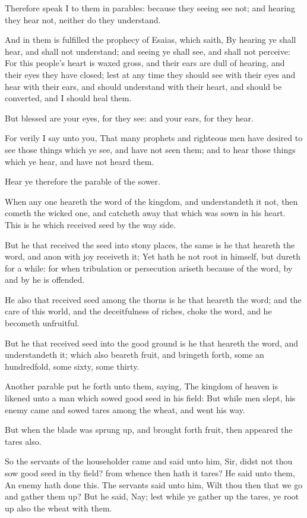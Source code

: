 \Verse Therefore speak I to them in parables: because they seeing see not; and hearing they hear not, neither do they understand.

\Verse And in them is fulfilled the prophecy of Esaias, which saith, By hearing ye shall hear, and shall not understand; and seeing ye shall see, and shall not perceive: \Verse For this people's heart is waxed gross, and their ears are dull of hearing, and their eyes they have closed; lest at any time they should see with their eyes and hear with their ears, and should understand with their heart, and should be converted, and I should heal them.

\Verse But blessed are your eyes, for they see: and your ears, for they hear.

\Verse For verily I say unto you, That many prophets and righteous men have desired to see those things which ye see, and have not seen them; and to hear those things which ye hear, and have not heard them.

\Verse Hear ye therefore the parable of the sower.

\Verse When any one heareth the word of the kingdom, and understandeth it not, then cometh the wicked one, and catcheth away that which was sown in his heart. This is he which received seed by the way side.

\Verse But he that received the seed into stony places, the same is he that heareth the word, and anon with joy receiveth it; \Verse Yet hath he not root in himself, but dureth for a while: for when tribulation or persecution ariseth because of the word, by and by he is offended.

\Verse He also that received seed among the thorns is he that heareth the word; and the care of this world, and the deceitfulness of riches, choke the word, and he becometh unfruitful.

\Verse But he that received seed into the good ground is he that heareth the word, and understandeth it; which also beareth fruit, and bringeth forth, some an hundredfold, some sixty, some thirty.

\Verse Another parable put he forth unto them, saying, The kingdom of heaven is likened unto a man which sowed good seed in his field: \Verse But while men slept, his enemy came and sowed tares among the wheat, and went his way.

\Verse But when the blade was sprung up, and brought forth fruit, then appeared the tares also.

\Verse So the servants of the householder came and said unto him, Sir, didst not thou sow good seed in thy field? from whence then hath it tares?  \Verse He said unto them, An enemy hath done this. The servants said unto him, Wilt thou then that we go and gather them up?  \Verse But he said, Nay; lest while ye gather up the tares, ye root up also the wheat with them.

